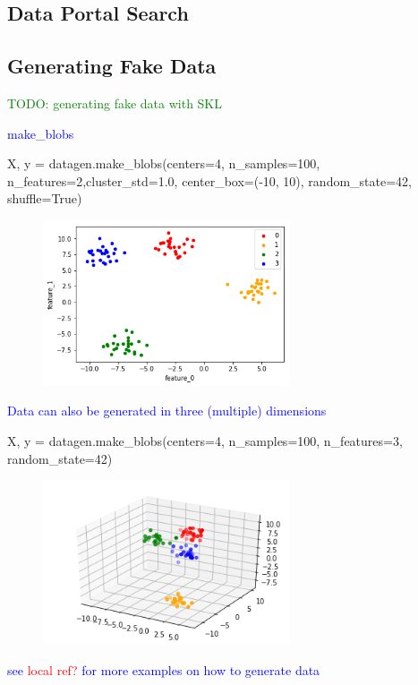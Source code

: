 \subsection{Data Portal Search}

\subsection{Generating Fake Data}

\textcolor{green}{TODO: generating fake data with SKL}

\textcolor{blue}{make\_blobs}

\begin{python}
X, y = datagen.make_blobs(centers=4, n_samples=100, n_features=2,cluster_std=1.0,
                          center_box=(-10, 10),
                          random_state=42, shuffle=True)
\end{python}


\begin{figure}
\centering
\includegraphics[width=0.65\textwidth]{./sync_imgs/datagen/blobs/2dimg.png}
\label{fig:datagen_blobs_2dimg}
\end{figure}

\textcolor{blue}{Data can also be generated in three (multiple) dimensions}

\begin{python}
X, y = datagen.make_blobs(centers=4, n_samples=100, n_features=3, random_state=42)
\end{python}



\begin{figure}
\centering
\includegraphics[width=0.65\textwidth]{./sync_imgs/datagen/blobs/3dimg.png}
\label{fig:datagen_blobs_3dimg}
\end{figure}



\textcolor{blue}{see \textcolor{red}{local ref?} for more examples on how to generate data}
